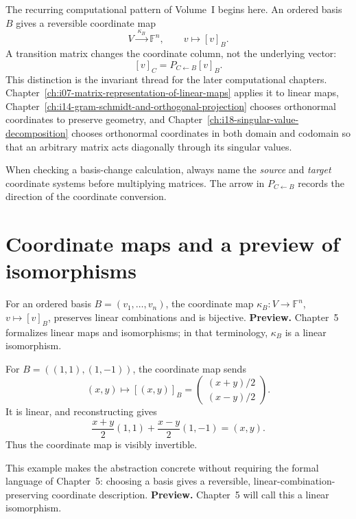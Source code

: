 \begin{remark}
The recurring computational pattern of Volume~I begins here.  An ordered basis
\(B\) gives a reversible coordinate map
\[
V\xrightarrow{\ \kappa_B\ }\mathbb F^n,\qquad v\longmapsto [v]_B.
\]
A transition matrix changes the coordinate column, not the underlying vector:
\[
[v]_C=P_{C\leftarrow B}[v]_B.
\]
This distinction is the invariant thread for the later computational chapters.
Chapter~\ref{ch:i07-matrix-representation-of-linear-maps} applies it to linear
maps, Chapter~\ref{ch:i14-gram-schmidt-and-orthogonal-projection} chooses
orthonormal coordinates to preserve geometry, and
Chapter~\ref{ch:i18-singular-value-decomposition} chooses orthonormal
coordinates in both domain and codomain so that an arbitrary matrix acts
diagonally through its singular values.

When checking a basis-change calculation, always name the \emph{source} and
\emph{target} coordinate systems before multiplying matrices.  The arrow in
\(P_{C\leftarrow B}\) records the direction of the coordinate conversion.
\end{remark}

\section{Coordinate maps and a preview of isomorphisms}
For an ordered basis $B=(v_1,\ldots,v_n)$, the coordinate map
$\kappa_B:V\to\mathbb F^n$, $v\mapsto[v]_B$, preserves linear combinations and
is bijective. \textbf{Preview.} Chapter~5 formalizes linear maps and
isomorphisms; in that terminology, $\kappa_B$ is a linear isomorphism.


\begin{example}\label{ex:i04-expand-01}
For \(B=((1,1),(1,-1))\), the coordinate map sends
\[
(x,y)\longmapsto [ (x,y) ]_B
=\begin{pmatrix}(x+y)/2\\(x-y)/2\end{pmatrix}.
\]
It is linear, and reconstructing gives
\[
\frac{x+y}{2}(1,1)+\frac{x-y}{2}(1,-1)=(x,y).
\]
Thus the coordinate map is visibly invertible.

This example makes the abstraction concrete without requiring the formal
language of Chapter~5: choosing a basis gives a reversible, linear-combination-
preserving coordinate description. \textbf{Preview.} Chapter~5 will call this
a linear isomorphism.
\end{example}
